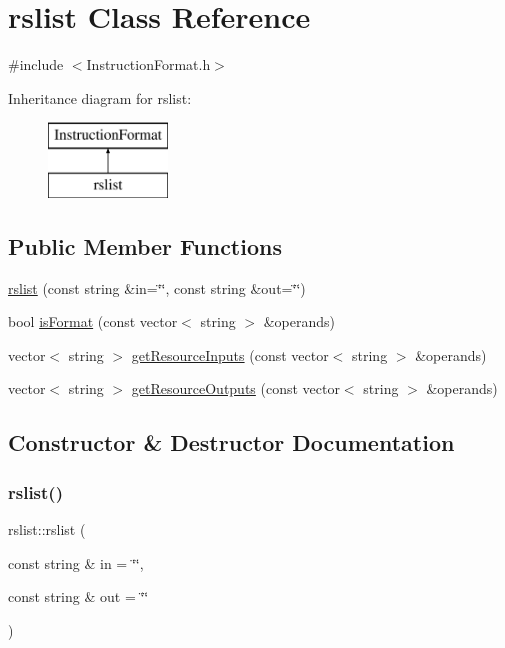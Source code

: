 \hypertarget{classrslist}{}\section{rslist Class Reference}
\label{classrslist}


{\ttfamily \#include $<$Instruction\+Format.\+h$>$}

Inheritance diagram for rslist\+:\begin{figure}[H]
\begin{center}
\leavevmode
\includegraphics[height=2.000000cm]{classrslist}
\end{center}
\end{figure}
\subsection*{Public Member Functions}
\begin{DoxyCompactItemize}
\item 
\hyperlink{classrslist_a8cc8507bb7463598b7af671bb9beadd9}{rslist} (const string \&in=\char`\"{}\char`\"{}, const string \&out=\char`\"{}\char`\"{})
\item 
bool \hyperlink{classrslist_aaa2d2aa941041c08369254f21e8846b7}{is\+Format} (const vector$<$ string $>$ \&operands)
\item 
vector$<$ string $>$ \hyperlink{classrslist_aecc14cc02c8e8e7cc6f1ac2989083bda}{get\+Resource\+Inputs} (const vector$<$ string $>$ \&operands)
\item 
vector$<$ string $>$ \hyperlink{classrslist_adc1bf6be9d82f0a616fc374023d8a636}{get\+Resource\+Outputs} (const vector$<$ string $>$ \&operands)
\end{DoxyCompactItemize}


\subsection{Constructor \& Destructor Documentation}
\mbox{\label{classrslist_a8cc8507bb7463598b7af671bb9beadd9}} 
\subsubsection{\texorpdfstring{rslist()}{rslist()}}
{\footnotesize\ttfamily rslist\+::rslist (\begin{DoxyParamCaption}\item[{const string \&}]{in = {\ttfamily \char`\"{}\char`\"{}},  }\item[{const string \&}]{out = {\ttfamily \char`\"{}\char`\"{}} }\end{DoxyParamCaption})}

